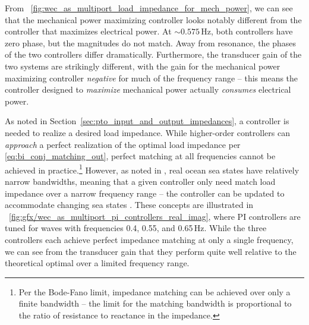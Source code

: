 \documentclass[lettersize,journal]{IEEEtran}
\begin{document}
%
From \figurename~\ref{fig:wec_as_multiport_load_impedance_for_mech_power}, we can see that the mechanical power maximizing controller looks notably different from the controller that maximizes electrical power.
At $\sim 0.575$\,Hz, both controllers have zero phase, but the magnitudes do not match.
Away from resonance, the phases of the two controllers differ dramatically.
Furthermore, the transducer gain of the two systems are strikingly different, with the gain for the mechanical power maximizing controller \emph{negative} for much of the frequency range -- this means the controller designed to \emph{maximize} mechanical power actually \emph{consumes} electrical power.

As noted in Section~\ref{sec:pto_input_and_output_impedances}, a controller is needed to realize a desired load impedance.
While higher-order controllers can \emph{approach} a perfect realization of the optimal load impedance per \eqref{eq:bi_conj_matching_out}, perfect matching at all frequencies cannot be achieved in practice.\footnote{Per the Bode-Fano limit, impedance matching can be achieved over only a finite bandwidth -- the limit for the matching bandwidth is proportional to the ratio of resistance to reactance in the impedance.}
However, as noted in \cite{Coe2020a}, real ocean sea states have relatively narrow bandwidths, meaning that a given controller only need match load impedance over a narrow frequency range -- the controller can be updated to accommodate changing sea states \cite{Forbush:2022aa}.
These concepts are illustrated in \figurename~\ref{fig:gfx/wec_as_multiport_pi_controllers_real_imag}, where PI controllers are tuned for waves with frequencies 0.4, 0.55, and 0.65\,Hz.
While the three controllers each achieve perfect impedance matching at only a single frequency, we can see from the transducer gain that they perform quite well relative to the theoretical optimal over a limited frequency range.
\end{document}
